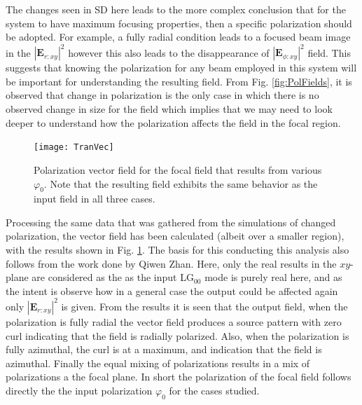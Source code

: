 \documentclass[12pt,a4paper]{article}
\begin{document}
The changes seen in SD here leads to the more complex conclusion that for the system to have maximum focusing properties, then a specific polarization should be adopted. For example, a fully radial condition leads to a focused beam image in the $|\textbf{E}_{r:xy}|^2$ however this also leads to the disappearance of $|\textbf{E}_{\phi:xy}|^2$ field. This suggests that knowing the polarization for any beam employed in this system will be important for understanding the resulting field. From Fig. \ref{fig:PolFields}, it is observed that change in polarization is the only case in which there is no observed change in size for the field which implies that we may need to look deeper to understand how the polarization affects the field in the focal region.

\begin{figure}
\centering\texttt{[image: TranVec]}
\caption{Polarization vector field for the focal field that results from various $\varphi_0$. Note that the resulting field exhibits the same behavior as the input field in all three cases.}
\label{TranVec}
\end{figure}

Processing the same data that was gathered from the simulations of changed polarization, the vector field has been calculated (albeit over a smaller region), with the results shown in Fig. \ref{TranVec}. The basis for this conducting this analysis also follows from the work done by Qiwen Zhan\cite{Zhan}. Here, only the real results in the $xy$-plane are considered as the as the input LG$_{00}$ mode is purely real here, and as the intent is observe how in a general case the output could be affected again only $|\textbf{E}_{r:xy}|^2$ is given. From the results it is seen that the output field, when the polarization is fully radial the vector field produces a source pattern with zero curl indicating that the field is radially polarized. Also, when the polarization is fully azimuthal, the curl is at a maximum, and indication that the field is azimuthal. Finally the equal mixing of polarizations results in a mix of polarizations a the focal plane. In short the polarization of the focal field follows directly the the input polarization $\varphi_0$ for the cases studied.
\end{document}
